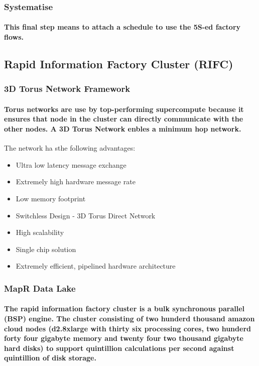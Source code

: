 \documentclass{acm_proc_article-sp}
\begin{document}
\subsubsection{Systematise}
\paragraph{This final step means to attach a schedule to use the 5S-ed factory flows.}
\pagebreak
\subsection{Rapid Information Factory Cluster (RIFC)}
\subsubsection{3D Torus Network Framework}
\paragraph{Torus networks are use by top-performing supercompute because it ensures that node in the cluster can directly communicate with the other nodes. A 3D Torus Network enbles a minimum hop network.}
{The network ha sthe following advantages:}
\begin{itemize}
  \item Ultra low latency message exchange
  \item Extremely high hardware message rate
  \item Low memory footprint
  \item Switchless Design - 3D Torus Direct Network
  \item High scalability
  \item Single chip solution
  \item Extremely efficient, pipelined hardware architecture
\end{itemize}
\subsubsection{MapR Data Lake}
\paragraph{The rapid information factory cluster is a bulk synchronous parallel (BSP) engine. The cluster consisting of two hunderd thousand amazon cloud nodes (d2.8xlarge with thirty six processing cores, two hunderd forty four gigabyte memory and twenty four two thousand gigabyte hard disks) to support quintillion calculations per second against quintillion of disk storage.}
\end{document}
